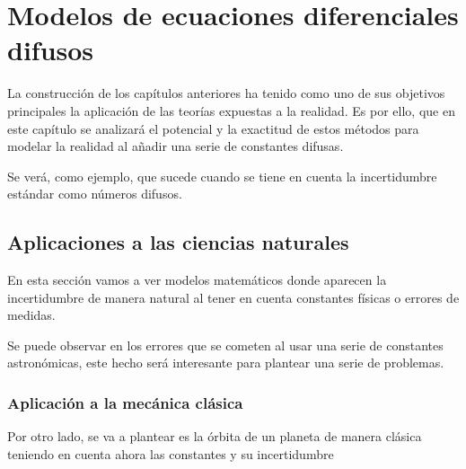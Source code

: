 
\chapter{Modelos de ecuaciones diferenciales difusos}
La construcción de los capítulos anteriores ha tenido como uno de sus objetivos principales la aplicación de las teorías expuestas a la realidad. Es por ello, que en este capítulo se analizará el potencial y la exactitud de estos métodos para modelar la realidad al añadir una serie de constantes difusas.

Se verá, como ejemplo, que sucede cuando se tiene en cuenta la incertidumbre estándar como números difusos.

\section{Aplicaciones a las ciencias naturales}

En esta sección vamos a ver modelos matemáticos donde aparecen la incertidumbre de manera natural al tener en cuenta constantes físicas o errores de medidas. 

Se puede observar en \cite{nasa} los errores que se cometen al usar una serie de constantes astronómicas, este hecho será interesante para plantear una serie de problemas.
\subsection{Aplicación a la mecánica clásica}
Por otro lado, se va a plantear es la órbita de un planeta de manera clásica teniendo en cuenta ahora las constantes y su incertidumbre

